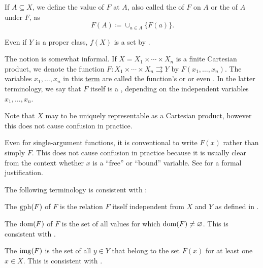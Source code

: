 \begin{definition}
\begin{DefEnum}[series=def:function]
     If \( A \subseteq X \), we define the value of \( F \) at \( A \), also called the  of \( F \) on \( A \) or the  of \( A \) under \( F \), as
    \begin{equation*}
      F(A) \coloneqq \cup_{a \in A} \{ F(a) \}.
    \end{equation*}

    Even if \( Y \) is a proper class, \( f(X) \) is a set by .

     The notion  is somewhat informal. If \( X = X_1 \times \cdots \times X_n \) is a finite Cartesian product, we denote the function \( F: X_1 \times \cdots \times X_n \rightrightarrows Y \) by \( F(x_1, \ldots, x_n) \). The variables \( x_1, \ldots, x_n \) in this \hyperref[def:first_order_syntax/term]{term} are called the function's  or  or even . In the latter terminology, we say that \( F \) itself is a , depending on the independent variables \( x_1, \ldots, x_n \).

    Note that \( X \) may to be uniquely representable as a Cartesian product, however this does not cause confusion in practice.

    Even for single-argument functions, it is conventional to write \( F(x) \) rather than simply \( F \). This does not cause confusion in practice because it is usually clear from the context whether \( x \) is a \enquote{free} or \enquote{bound} variable. See  for a formal justification.
  \end{DefEnum}

  The following terminology is consistent with :
  \begin{DefEnum}[resume=def:function]
     The  \( \operatorname{gph}(F) \) of \( F \) is the relation \( F \) itself independent from \( X \) and \( Y \) as defined in .

     The  \( \operatorname{dom}(F) \) of \( F \) is the set of all values for which \( \operatorname{dom}(F) \neq \varnothing \). This is consistent with .

     The  \( \operatorname{img}(F) \) is the set of all \( y \in Y \) that belong to the set \( F(x) \) for at least one \( x \in X \). This is consistent with .


\end{DefEnum}
\end{definition}
